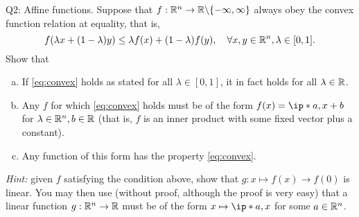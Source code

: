 \documentclass{article}
\begin{document}
\begin{problem}
    {Q2: Affine functions.}
    Suppose that $f:\mathbb{R}^n\rightarrow\mathbb{R}\backslash\{-\infty,\infty\}$ always obey the convex function relation at equality, that is,
    \begin{equation}
        \label{eq:convex}
        f(\lambda x+(1-\lambda)y) \leq \lambda f(x)+(1-\lambda)f(y),\quad \forall x,y\in\mathbb{R}^n,\lambda\in[0,1].
    \end{equation}
    Show that
    \begin{enumerate}[(a)]
        \item If \cref{eq:convex} holds as stated for all $\lambda\in[0,1]$, it in fact holds for all $\lambda\in\mathbb{R}$.\label{item:convex}
        \item Any $f$ for which \cref{eq:convex} holds must be of the form $f(x)=\ip*{a,x}+b$ for $\lambda\in\mathbb{R}^n,b\in\mathbb{R}$ (that is, $f$ is an inner product with some fixed vector plus a constant).
        \item Any function of this form has the property \cref{eq:convex}.
    \end{enumerate}
    \textit{Hint:} given $f$ satisfying the condition above, show that $g:x\mapsto f(x)\rightarrow f(0)$ is linear. You may then use (without proof, although the proof is very easy) that a linear function $g: \mathbb{R}^n \rightarrow \mathbb{R}$ must be of the form $x \mapsto \ip*{a,x}$ for some $a \in \mathbb{R}^n$.
\end{problem}
\end{document}
